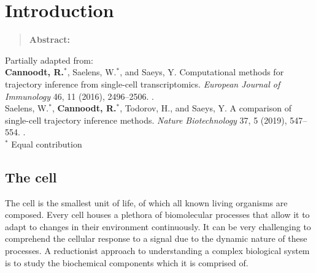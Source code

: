 \newpage{\thispagestyle{empty}\cleardoublepage}
\chapter{Introduction} 
\label{chap:introduction}

\begin{quote}
	\textbf{Abstract:} 
	
\end{quote}

\vfill

Partially adapted from:\\
\textbf{Cannoodt, R.}$^*$, Saelens, W.$^*$, and Saeys, Y. Computational methods for trajectory inference from single-cell transcriptomics. \textit{European Journal of Immunology} 46, 11 (2016), 2496--2506. .\\
Saelens, W.$^*$, \textbf{Cannoodt, R.}$^*$, Todorov, H., and Saeys, Y. A comparison of single-cell trajectory inference methods. \textit{Nature Biotechnology} 37, 5 (2019), 547--554. .\\
{\footnotesize $^*$ Equal contribution}
\newpage

\section{The cell}
The cell is the smallest unit of life, of which all known living organisms are composed. Every cell houses a plethora of biomolecular processes that allow it to adapt to changes in their environment continuously. It can be very challenging to comprehend the cellular response to a signal due to the dynamic nature of these processes. A reductionist approach to understanding a complex biological system is to study the biochemical components which it is comprised of\cite{brigandt_reductionismbiology_2017}.

